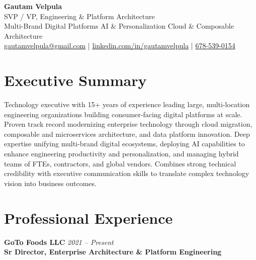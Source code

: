 \documentclass[11pt]{article}
\begin{document}
\begin{center}
    {\LARGE \textbf{Gautam Velpula}} \\[4pt]
    SVP / VP, Engineering \& Platform Architecture \\[6pt]
    Multi-Brand Digital Platforms \textbullet{} AI \& Personalization \textbullet{} Cloud \& Composable Architecture \\[6pt]
    \href{mailto:gautamvelpula@gmail.com}{gautamvelpula@gmail.com} \;|\;
    \href{https://www.linkedin.com/in/gautamvelpula}{linkedin.com/in/gautamvelpula} \;|\;
    \href{tel:6785390154}{678-539-0154}
  \end{center}

\vspace{8pt}

\section*{Executive Summary}
Technology executive with 15+ years of experience leading large, multi-location engineering organizations building consumer-facing digital platforms at scale. Proven track record modernizing enterprise technology through cloud migration, composable and microservices architecture, and data platform innovation. Deep expertise unifying multi-brand digital ecosystems, deploying AI capabilities to enhance engineering productivity and personalization, and managing hybrid teams of FTEs, contractors, and global vendors. Combines strong technical credibility with executive communication skills to translate complex technology vision into business outcomes.

\section*{Professional Experience}

\textbf{GoTo Foods LLC} \hfill \textit{2021 -- Present} \\
\textbf{Sr Director, Enterprise Architecture \& Platform Engineering}
\end{document}
